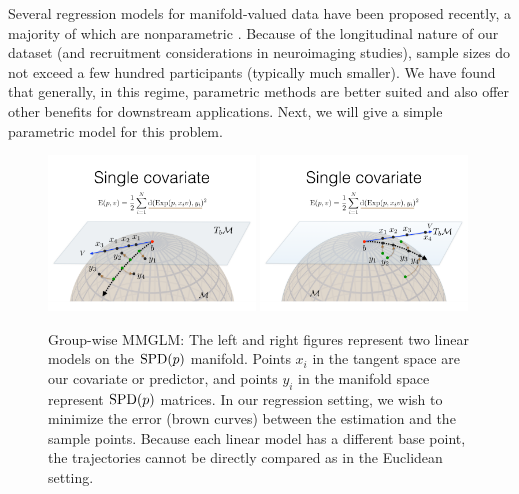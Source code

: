 Several regression models for manifold-valued data have been proposed recently, a majority of 
which are nonparametric \cite{jayasumanakernel,banerjee2015nonlinear}. 
Because of the longitudinal nature of our dataset (and recruitment considerations in neuroimaging studies),
sample sizes do not exceed a few hundred participants (typically much smaller). 
We have found that generally, in this regime, parametric methods are better suited and also offer other benefits for downstream applications. 
Next, we will give a simple parametric model for this problem. 
\begin{figure}[t]
  \centering
  \includegraphics[width=0.49\textwidth,trim={10 40 10 220},clip]{3_covtraj/figs/MGLM1.png}
    \includegraphics[width=0.49\textwidth,trim={10 40 10 220},clip]{3_covtraj/figs/MGLM2.png}
  \caption[Group-wise comparisons of manifold trajectories]{\label{fig:manifold}Group-wise MMGLM: The left and right figures represent two linear models on the $\text{SPD}(p)$ manifold. Points $x_i$ in the tangent space are our covariate or predictor, and points $y_i$ in the manifold space represent $\text{SPD}(p)$ matrices. In our regression setting, we wish to minimize the error (brown curves) between the estimation and the sample points. Because each linear model has a different base point, the trajectories cannot be directly compared as in the Euclidean setting.}
\end{figure}
